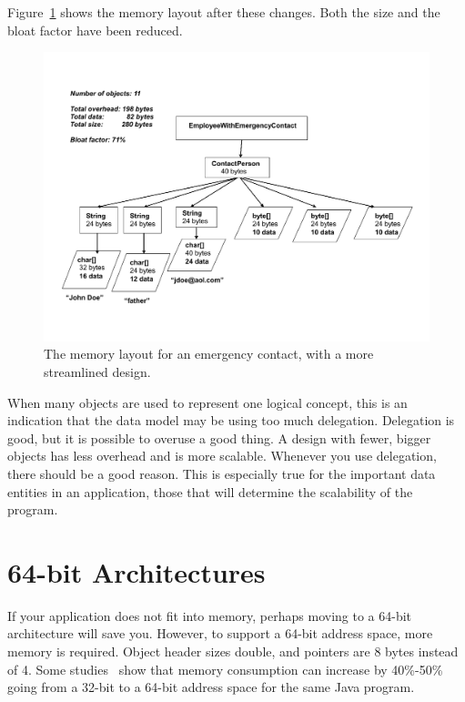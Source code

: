 Figure~\ref{fig:refactored-fine-grain} shows the memory layout after these changes. Both the size
and the bloat factor have been reduced.
 \begin{figure}[htbp]
  \centering
 \includegraphics[width=\textwidth]{part1/Figures/modelingdatatypes/refactored-fine-grain.pdf}
  \caption{The memory layout for an emergency contact, with a more streamlined
  design.}
  \label{fig:refactored-fine-grain}
\end{figure}

When many objects are used to represent one logical concept, this is an indication that the
data model may be using too much delegation. Delegation is good, but it is possible to overuse a good thing.
A design with fewer, bigger objects has less overhead and is more scalable. Whenever you use delegation, there should
be a good reason. This is especially true for the important data entities in an application, those that will determine
the scalability of the program.  
 
 
\section{64-bit Architectures}

If your application does not fit into memory, perhaps moving to a 64-bit architecture will save you. 
However, to support a 64-bit address space, more memory is required. Object header sizes double, and pointers are
8 bytes instead of 4. Some studies~\cite{compressedAddress} show that memory consumption can increase by 40\%-50\%
going from a 32-bit to a 64-bit address space for the same Java program.

